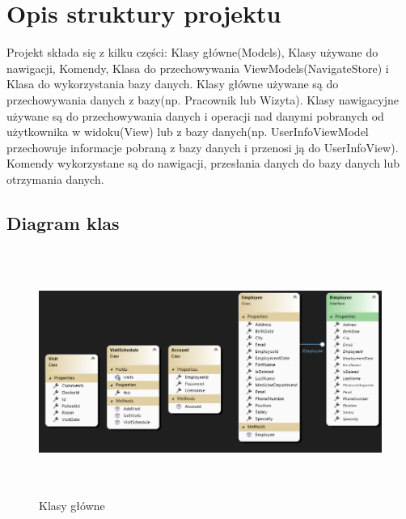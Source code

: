 ﻿%
\chapter{Opis struktury projektu}

Projekt składa się z kilku części: Klasy główne(Models), Klasy używane do nawigacji, Komendy, Klasa do przechowywania ViewModels(NavigateStore) i Klasa do wykorzystania bazy danych. Klasy główne używane są do przechowywania danych z bazy(np. Pracownik lub Wizyta). Klasy nawigacyjne używane są do przechowywania danych i operacji nad danymi pobranych od użytkownika w widoku(View) lub z bazy danych(np. UserInfoViewModel przechowuje informacje pobraną z bazy danych i przenosi ją do UserInfoView). Komendy wykorzystane są do nawigacji, przesłania danych do bazy danych lub otrzymania danych.

\section{Diagram klas}

\begin{figure}[H]
\begin{center}
    \includegraphics[height=8cm]{images/diag_gl_kl.png}
    \caption{Klasy główne}
\end{center}
\end{figure}

